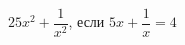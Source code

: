 \begin{ex}[type=calculate_expression]
	\begin{condition}
		\( 25x^2+\dfrac{1}{x^2} \), \quad если \( 5x+\dfrac{1}{x}=4 \)
	\end{condition}
\end{ex}